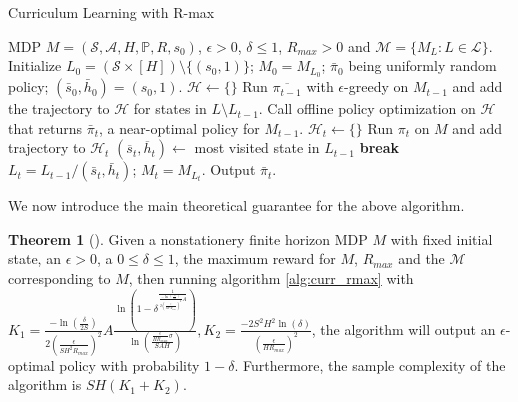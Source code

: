 \documentclass[12pt, letterpaper]{article}
\theoremstyle{definition}
\newtheorem*{thm}{Theorem}
\theoremstyle{remark}
\begin{document}
\begin{algorithm}[H]
    \caption{Curriculum Learning with R-max}
    \label{alg:curr_rmax}
\begin{algorithmic}[1]
    \Require MDP $M = (\mathcal{S}, \mathcal{A}, H, \mathbb{P}, R, s_0)$, $\epsilon > 0$, $\delta \leq 1$, $R_{max} > 0$ and $\mathcal{M} = \{M_L: L \in \mathcal{L}\}$.
    \State Initialize $L_0 = (\mathcal{S} \times [H]) \setminus \{(s_0, 1)\}$; $M_0 = M_{L_0}$; $\bar\pi_0$ being uniformly random policy; $(\bar s_0, \bar h_0) = (s_0, 1)$.
    \State \(\mathcal{H} \gets \{\}\)
            \State Run \(\overline{\pi_{t-1}}\) with \(\epsilon\)-greedy on $M_{t-1}$ and add the trajectory to $\mathcal{H}$ for states in \(L \setminus L_{t-1}\).
        \EndFor
        \State Call offline policy optimization on $\mathcal{H}$ that returns $\bar \pi_{t}$, a near-optimal policy for $M_{t-1}$.
        \State \(\mathcal{H}_t \gets \{\}\)
            \State Run \(\pi_t\) on \(M\) and add trajectory to \(\mathcal{H}_t\)
        \EndFor
            \State \((\overline{s}_t, \overline{h}_t) \gets\) most visited state in \(L_{t-1}\)
        \Else
            \State \textbf{break}
        \EndIf
        \State $L_t = L_{t-1} / (\bar s_t, \bar h_t)$; $M_t = M_{L_t}$.
    \EndFor
    \State Output $\bar \pi_t$.
\end{algorithmic}
\end{algorithm}

We now introduce the main theoretical guarantee for the above algorithm.

\begin{thm}[]
    Given a nonstationery finite horizon MDP \(M\) with fixed initial state, an \(\epsilon > 0\), a \(0 \leq \delta \leq 1\), the maximum reward for \(M\), \(R_{max}\) and the \(\mathcal{M}\) corresponding to \(M\), then running algorithm \ref{alg:curr_rmax} with \(K_1 = \frac{-\ln(\frac{\delta}{2S})}{2(\frac{\epsilon}{SH^2 R_{max}})^2}A \frac{\ln(1 - \delta^{\frac{1}{\frac{-\ln(\frac{\delta}{2S})}{2(\frac{\epsilon}{SH^2 R_{max}})^2} A}})}{\ln(\frac{\frac{\epsilon}{HR_{max}} \sigma}{SAH})}, K_2 = \frac{-2S^2H^2 \ln(\delta)}{(\frac{\epsilon}{HR_{max}})^2}\), the algorithm will output an \(\epsilon\)-optimal policy with probability \(1 - \delta\). Furthermore, the sample complexity of the algorithm is \(SH(K_1 + K_2)\).
\end{thm}
\end{document}
